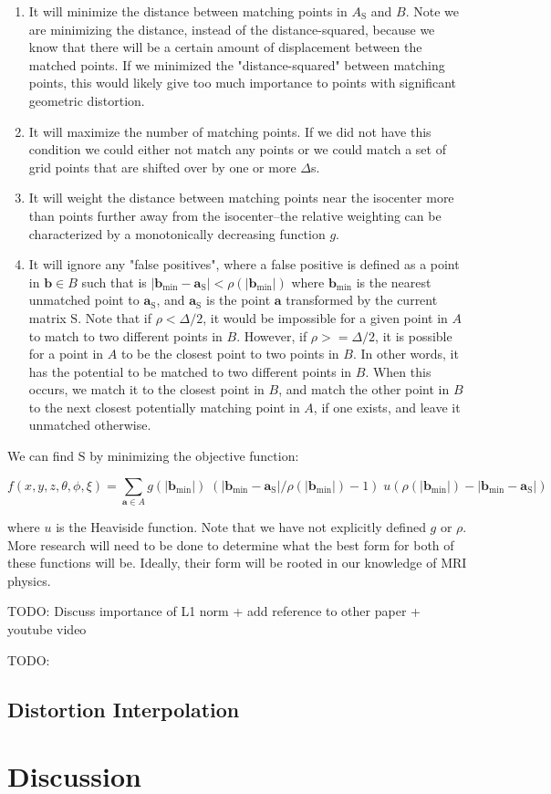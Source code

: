 \documentclass[12pt]{article}
\begin{document}
\begin{enumerate}
\item It will minimize the distance between matching points in $A_\mathrm{S}$ and $B$.  Note we are minimizing the distance, instead of the distance-squared, because we know that there will be a certain amount of displacement between the matched points.  If we minimized the "distance-squared" between matching points, this would likely give too much importance to points with significant geometric distortion.
\item It will maximize the number of matching points.  If we did not have this condition we could either not match any points or we could match a set of grid points that are shifted over by one or more $\Delta$s.
\item It will weight the distance between matching points near the isocenter more than points further away from the isocenter--the relative weighting can be characterized by a monotonically decreasing function $g$.
\item It will ignore any "false positives", where a false positive is defined as a point in $\mathbf{b} \in B$ such that is $|\mathbf{b}_\textrm{min} − \mathbf{a}_\textrm{S}| < \rho(|\mathbf{b}_\textrm{min}|)$ where $\mathbf{b}_\textrm{min}$ is the nearest unmatched point to $\mathbf{a}_\textrm{S}$, and $\mathbf{a}_\textrm{S}$ is the point $\mathbf{a}$ transformed by the current matrix $\textrm{S}$.  Note that if $\rho < \Delta/2$, it would be impossible for a given point in $A$ to match to two different points in $B$.  However, if $\rho >= \Delta/2$, it is possible for a point in $A$ to be the closest point to two points in $B$.  In other words, it has the potential to be matched to two different points in $B$.  When this occurs, we match it to the closest point in $B$, and match the other point in $B$ to the next closest potentially matching point in $A$, if one exists, and leave it unmatched otherwise.
\end{enumerate}

We can find $\mathrm{S}$ by minimizing the objective function:

$$
f(x, y, z, \theta, \phi, \xi) =
\sum_{\mathbf{a} \in A} g(\left|\mathbf{b}_\textrm{min}\right|)
\;
(\left|\mathbf{b}_\textrm{min} - \mathbf{a}_\textrm{S}\right|/\rho(|\mathbf{b}_\textrm{min}|) - 1)
\;
u(\rho(|\mathbf{b}_\textrm{min}|) - \left|\mathbf{b}_\textrm{min} - \mathbf{a}_\textrm{S}\right|)
$$

where $u$ is the Heaviside function.  Note that we have not explicitly defined $g$ or $\rho$.  More research will need to be done to determine what the best form for both of these functions will be.  Ideally, their form will be rooted in our knowledge of MRI physics.

TODO: Discuss importance of L1 norm + add reference to other paper + youtube video

TODO: 


\subsection{Distortion Interpolation}


\section{Discussion}



\end{document}
